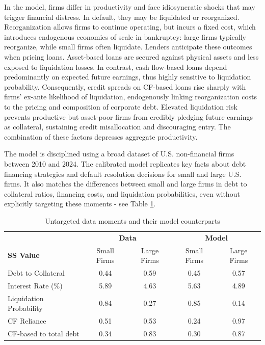 \documentclass[12pt]{article}
\begin{document}
In the model, firms differ in productivity and face idiosyncratic shocks that may trigger financial distress. In default, they may be liquidated or reorganized. Reorganization allows firms to continue operating, but incurs a fixed cost, which introduces endogenous economies of scale in bankruptcy: large firms typically reorganize, while small firms often liquidate. Lenders anticipate these outcomes when pricing loans. Asset-based loans are secured against physical assets and less exposed to liquidation losses. In contrast, cash flow-based loans depend predominantly on expected future earnings, thus highly sensitive to liquidation probability. Consequently, credit spreads on CF-based loans rise sharply with firms' ex-ante likelihood of liquidation, endogenously linking reorganization costs to the pricing and composition of corporate debt. Elevated liquidation risk prevents productive but asset-poor firms from credibly pledging future earnings as collateral, sustaining credit misallocation and discouraging entry. The combination of these factors depresses aggregate productivity.

The model is disciplined using a broad dataset of U.S. non-financial firms between 2010 and 2024. The calibrated model replicates key facts about debt financing strategies and default resolution decisions for small and large U.S. firms. It also matches the differences between small and large firms in debt to collateral ratios, financing costs, and liquidation probabilities, even without explicitly targeting these moments - see Table \ref{tab:untargeted}.

\begin{table}[h!]
    \centering
    \begin{tabular}{lcccc}
    \toprule
     &  \multicolumn{2}{c}{\textbf{Data}} & \multicolumn{2}{c}{\textbf{Model}} \\ 
     \textbf{SS Value}  & Small Firms & Large Firms & Small Firms & Large Firms  \\ 
    \midrule
    Debt to Collateral & 0.44 & 0.59 & 0.45 & 0.57 \\ 
    Interest Rate (\%) & 5.89 & 4.63 & 5.63 & 4.89 \\ 
    Liquidation Probability & 0.84 & 0.27 & 0.85 & 0.14 \\ 
    CF Reliance & 0.51 & 0.53 & 0.24 & 0.97 \\ 
    CF-based to total debt & 0.34 & 0.83 & 0.30 & 0.87 \\ 
    \bottomrule
    \end{tabular}
    \caption{Untargeted data moments and their model counterparts}
    \label{tab:untargeted}
\end{table}
\end{document}
